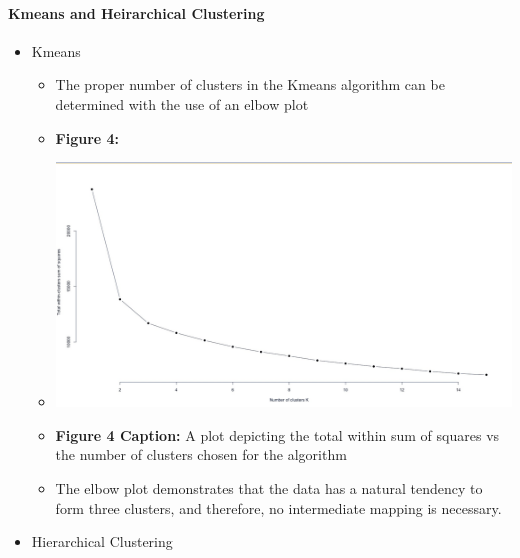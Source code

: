 \documentclass[12pt,]{article}
\providecommand{\tightlist}{%
  \setlength{\itemsep}{0pt}\setlength{\parskip}{0pt}}
\let\oldparagraph\paragraph
\renewcommand{\paragraph}[1]{\oldparagraph{#1}\mbox{}}
\begin{document}
\hypertarget{kmeans-and-heirarchical-clustering}{%
\paragraph{Kmeans and Heirarchical
Clustering}\label{kmeans-and-heirarchical-clustering}}

\begin{itemize}
\tightlist
\item
  Kmeans

  \begin{itemize}
  \tightlist
  \item
    The proper number of clusters in the Kmeans algorithm can be
    determined with the use of an elbow plot
  \item
    \textbf{Figure 4:}
  \item
    \includegraphics{ElbowPlot.jpeg}
  \item
    \textbf{Figure 4 Caption:} A plot depicting the total within sum of
    squares vs the number of clusters chosen for the algorithm
  \item
    The elbow plot demonstrates that the data has a natural tendency to
    form three clusters, and therefore, no intermediate mapping is
    necessary.
  \end{itemize}
\item
  Hierarchical Clustering


\end{itemize}
\end{document}
